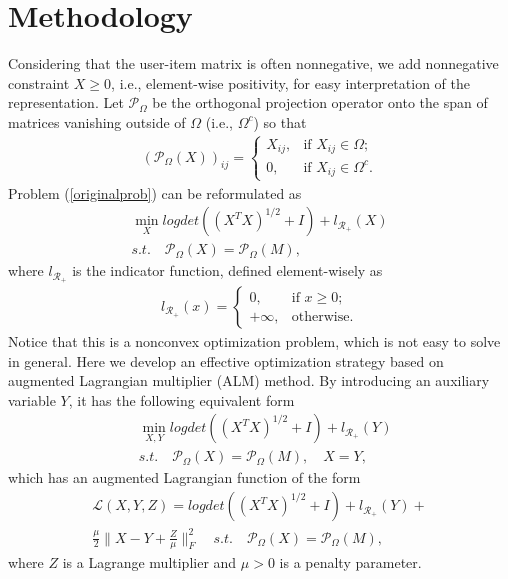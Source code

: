 \documentclass[letterpaper]{article}
\begin{document}
\section{Methodology}
 Considering that the user-item matrix is often nonnegative, we add nonnegative constraint $X\ge 0$, i.e., element-wise positivity, for easy interpretation of the representation. Let $\mathcal{P}_\Omega$ be the orthogonal projection operator onto the span of matrices vanishing outside of $\Omega$ (i.e., $\Omega^c$) so that 
\begin{eqnarray*}
(\mathcal{P}_\Omega(X))_{ij}=\left\{
\begin{array}{ll} X_{ij}, & \mbox{if $X_{ij}\in\Omega$};\\
0, & \mbox{if $X_{ij}\in\Omega^c$.}
\end{array}\right.
\end{eqnarray*} 
Problem (\ref{originalprob}) can be reformulated as 
\begin{equation}
\begin{split}
\min_X logdet ((X^TX)^{1/2}+I)+l_{\mathcal{R}_+}(X)   \\
s.t.\quad \mathcal{P}_\Omega(X)=\mathcal{P}_\Omega(M),  
\end{split}
\end{equation}
where $l_{\mathcal{R}_+}$ is the indicator function, defined element-wisely as
\begin{eqnarray*}
\label{error21}
l_{\mathcal{R}_+}(x)=\left\{
\begin{array}{ll} 0, & \mbox{if $x\geq 0$};\\
+\infty, & \mbox{otherwise.}
\end{array}\right.
\end{eqnarray*}
Notice that this is a nonconvex optimization problem, which is not easy to solve in general. Here we develop an effective optimization strategy based on augmented Lagrangian
multiplier (ALM) method. By introducing an auxiliary variable $Y$, it has the following equivalent form
\begin{equation}
\label{secondprob}
\begin{split}
&\min_{X, Y} logdet ((X^TX)^{1/2}+I)+l_{\mathcal{R}_+}(Y)   \\
&s.t.\quad \mathcal{P}_\Omega(X)=\mathcal{P}_\Omega(M),\quad X=Y,  
\end{split}
\end{equation}
which has an augmented Lagrangian function of the form
\begin{equation}
\begin{split}
\mathcal{L}(X,Y,Z)= logdet ((X^TX)^{1/2}+I)+l_{\mathcal{R}_+}(Y)+\\
\frac{\mu}{2}\|X-Y+\frac{Z}{\mu}\|_F^2
\quad s.t.\quad \mathcal{P}_\Omega(X)=\mathcal{P}_\Omega(M),  
\end{split}
\end{equation}
where $Z$ is a Lagrange multiplier and $\mu>0$ is a penalty parameter.
\end{document}
